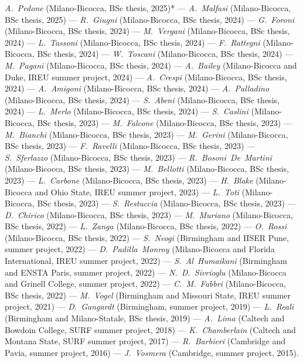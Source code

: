 \textit{\textit{A.~Pedone}} (Milano-Bicocca, BSc thesis, 2025)* --- 
\textit{\textit{A.~Malfasi}} (Milano-Bicocca, BSc thesis, 2025) --- 
\textit{\textit{R.~Giugni}} (Milano-Bicocca, BSc thesis, 2024) --- 
\textit{\textit{G.~Foroni}} (Milano-Bicocca, BSc thesis, 2024) --- 
\textit{\textit{M.~Vergani}} (Milano-Bicocca, BSc thesis, 2024) --- 
\textit{\textit{L.~Tassoni}} (Milano-Bicocca, BSc thesis, 2024) --- 
\textit{\textit{F.~Rattegni}} (Milano-Bicocca, BSc thesis, 2024) --- 
\textit{\textit{W.~Toscani}} (Milano-Bicocca, BSc thesis, 2024) --- 
\textit{\textit{M.~Pagani}} (Milano-Bicocca, BSc thesis, 2024) --- 
\textit{\textit{A.~Bailey}} (Milano-Bicocca and Duke, IREU summer project, 2024) --- 
\textit{\textit{A.~Crespi}} (Milano-Bicocca, BSc thesis, 2024) --- 
\textit{\textit{A.~Amigoni}} (Milano-Bicocca, BSc thesis, 2024) --- 
\textit{\textit{A.~Palladino}} (Milano-Bicocca, BSc thesis, 2024) --- 
\textit{\textit{S.~Abeni}} (Milano-Bicocca, BSc thesis, 2024) --- 
\textit{\textit{L.~Merlo}} (Milano-Bicocca, BSc thesis, 2024) --- 
\textit{\textit{S.~Caslini}} (Milano-Bicocca, BSc thesis, 2023) --- 
\textit{\textit{M.~Falcone}} (Milano-Bicocca, BSc thesis, 2023) --- 
\textit{\textit{M.~Bianchi}} (Milano-Bicocca, BSc thesis, 2023) --- 
\textit{\textit{M.~Gerini}} (Milano-Bicocca, BSc thesis, 2023) --- 
\textit{\textit{F.~Ravelli}} (Milano-Bicocca, BSc thesis, 2023) --- 
\textit{\textit{S.~Sferlazzo}} (Milano-Bicocca, BSc thesis, 2023) --- 
\textit{\textit{R.~Bosoni~De~Martini}} (Milano-Bicocca, BSc thesis, 2023) --- 
\textit{\textit{M.~Bellotti}} (Milano-Bicocca, BSc thesis, 2023) --- 
\textit{\textit{L.~Carbone}} (Milano-Bicocca, BSc thesis, 2023) --- 
\textit{\textit{H.~Blake}} (Milano-Bicocca and Ohio State, IREU summer project, 2023) --- 
\textit{\textit{L.~Toti}} (Milano-Bicocca, BSc thesis, 2023) --- 
\textit{\textit{S.~Restuccia}} (Milano-Bicocca, BSc thesis, 2023) --- 
\textit{\textit{D.~Chirico}} (Milano-Bicocca, BSc thesis, 2023) --- 
\textit{\textit{M.~Muriano}} (Milano-Bicocca, BSc thesis, 2022) --- 
\textit{\textit{L.~Zanga}} (Milano-Bicocca, BSc thesis, 2022) --- 
\textit{\textit{O.~Rossi}} (Milano-Bicocca, BSc thesis, 2022) --- 
\textit{\textit{S.~Neogi}} (Birmingham and IISER Pune, summer project, 2022) --- 
\textit{\textit{D.~Padilla~Monroy}} (Milano-Bicocca and Florida International, IREU summer project, 2022) --- 
\textit{\textit{S.~Al~Humaikani}} (Birmingham and ENSTA Paris, summer project, 2022) --- 
\textit{\textit{N.~D.~Sivrioglu}} (Milano-Bicocca and Grinell College, summer project, 2022) --- 
\textit{\textit{C.~M.~Fabbri}} (Milano-Bicocca, BSc thesis, 2022) --- 
\textit{\textit{M.~Vogel}} (Birmingham and Missouri State, IREU summer project, 2021) --- 
\textit{\textit{D.~Gangardt}} (Birmingham, summer project, 2019) --- 
\textit{\textit{L.~Reali}} (Birmingham and Milano-Statale, BSc thesis, 2019) --- 
\textit{\textit{A.~Lima}} (Caltech and Bowdoin College, SURF summer project, 2018) --- 
\textit{\textit{K.~Chamberlain}} (Caltech and Montana State, SURF summer project, 2017) --- 
\textit{\textit{R.~Barbieri}} (Cambridge and Pavia, summer project, 2016) --- 
\textit{\textit{J.~Vosmera}} (Cambridge, summer project, 2015).